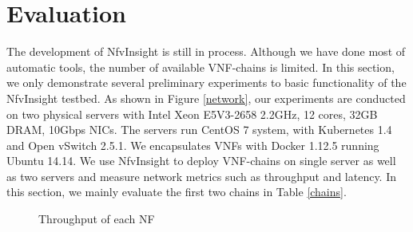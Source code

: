 \section{Evaluation}
The development of NfvInsight is still in process. 
Although we have done most of automatic tools, the number of 
available VNF-chains is limited. In this section, we only 
demonstrate several preliminary experiments to basic functionality 
of the NfvInsight testbed. As shown in Figure \ref{network},
our experiments are conducted on two 
physical servers with Intel Xeon E5V3-2658 2.2GHz, 
12 cores, 32GB DRAM, 10Gbps NICs. The servers run 
CentOS 7 system, with Kubernetes 1.4 and Open vSwitch 2.5.1. 
We encapsulates VNFs with Docker 1.12.5 running Ubuntu 14.14.
We use NfvInsight to deploy VNF-chains on single server 
as well as two servers and measure network metrics 
such as throughput and latency.
In this section, we mainly evaluate the first two chains in Table \ref{chains}.


%

\begin{figure}[!t]
\centering
{}
\hfil
{}
\hfil
\caption{Throughput of each NF}
\label{throughput}
\end{figure}

